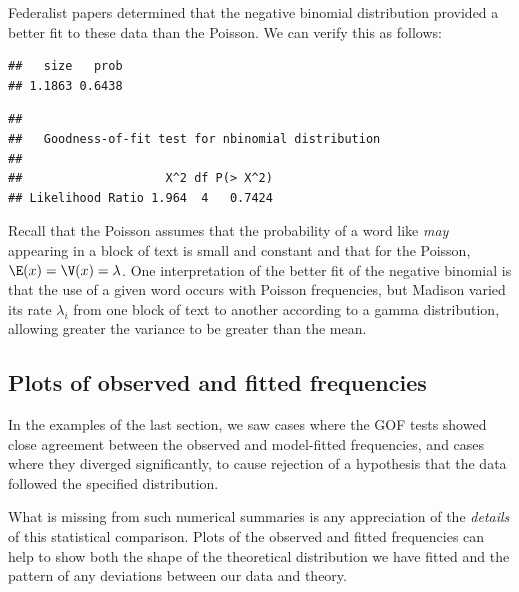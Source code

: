 \documentclass[11pt]{book}
\renewenvironment{knitrout}{\small\renewcommand{\baselinestretch}{.85}}{} %
\begin{document}
\begin{Example}[Fedfit]{Federalist papers}
\citet{MostellerWallace:63} determined that the negative binomial distribution
provided a better fit to these data than the Poisson.  We can verify this as follows:
\begin{knitrout}
\color{fgcolor}\begin{kframe}
\begin{alltt}
 \hlkwb{<-}   \hlstd{=} \hlstd{)}
\hlopt{$}
\end{alltt}
\begin{verbatim}
##   size   prob 
## 1.1863 0.6438
\end{verbatim}
\begin{alltt}
\end{alltt}
\begin{verbatim}
## 
## 	 Goodness-of-fit test for nbinomial distribution
## 
##                    X^2 df P(> X^2)
## Likelihood Ratio 1.964  4   0.7424
\end{verbatim}
\end{kframe}
\end{knitrout}
Recall that the Poisson assumes that the probability of a word like \emph{may}
appearing in a block of text is small and constant and that for the Poisson,
$\E (x) = \V(x) =\lambda$.  
One interpretation of the better fit of the negative binomial is that 
the use of a given word occurs with Poisson frequencies, but Madison
varied its rate $\lambda_i$ from one block of text to another
according to a gamma distribution, allowing greater the variance to be
greater than the mean.

\end{Example}

\subsection{Plots of observed and fitted frequencies}\label{sec:fitplot}

In the examples of the last section, we saw cases where 
the GOF tests showed close agreement between the observed and
model-fitted frequencies, and cases where they diverged significantly,
to cause rejection of a hypothesis that the data followed the
specified distribution.  

What is missing from such numerical summaries is any appreciation
of the \emph{details} of this statistical comparison.
Plots of the observed and fitted frequencies can help to show
both the shape of the theoretical distribution we have fitted and the
pattern of any deviations between our data and theory.
\end{document}
